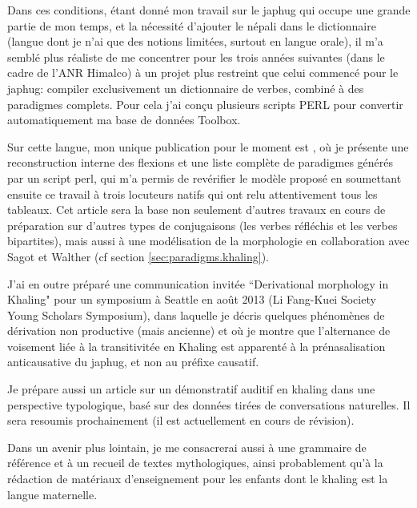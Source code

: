 \documentclass[oldfontcommands,oneside,a4paper,11pt]{memoir}
\begin{document}
Dans ces conditions, étant donné mon travail sur le japhug qui occupe une grande partie de mon temps, et la nécessité d'ajouter le népali dans le dictionnaire (langue dont je n'ai que des notions limitées, surtout en langue orale), il m'a semblé plus réaliste de me concentrer pour les trois années suivantes (dans le cadre de l'ANR Himalco) à un projet plus restreint que celui commencé pour le japhug: compiler exclusivement un dictionnaire de verbes, combiné à des paradigmes complets. Pour cela j'ai conçu plusieurs scripts PERL pour convertir automatiquement ma base de données Toolbox.

Sur cette langue, mon unique publication pour le moment est \citet{jacques12khaling}, où je présente une reconstruction interne des flexions et une liste complète de paradigmes générés par un script perl, qui m'a permis de revérifier le modèle proposé en soumettant ensuite ce travail à trois locuteurs natifs qui ont relu attentivement tous les tableaux. Cet article sera la base non seulement d'autres travaux en cours de préparation sur d'autres types de conjugaisons (les verbes réfléchis et les verbes bipartites), mais aussi à une modélisation de la morphologie en collaboration avec Sagot et Walther (cf section \ref{sec:paradigms.khaling}).

J'ai en outre préparé une communication invitée ``Derivational morphology in Khaling"   pour un symposium à Seattle en août 2013 (Li Fang-Kuei Society Young Scholars Symposium), dans laquelle je décris quelques phénomènes de dérivation non productive (mais ancienne) et où je montre que l'alternance de voisement liée à la transitivitée en Khaling est apparenté à la prénasalisation anticausative du japhug, et non au préfixe causatif.

Je prépare aussi un article sur un démonstratif auditif en khaling dans une perspective typologique, basé sur des données tirées de conversations naturelles. Il sera resoumis prochainement (il est actuellement en cours de révision).


Dans un avenir plus lointain, je me consacrerai aussi à une grammaire de référence et à un recueil de textes mythologiques, ainsi probablement qu'à la rédaction de matériaux d'enseignement pour les enfants dont le khaling est la langue maternelle.
\end{document}
